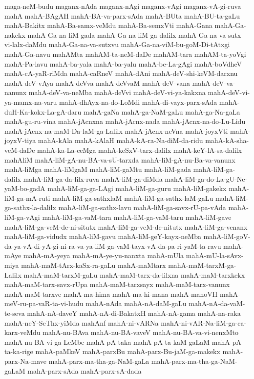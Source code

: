 {maga-neM-budu
maganx-nAda
maganx-nAgi
maganx-vAgi
maganx-vA-gi-ruva
mahA
mahA-BAgAH
mahA-BA-va-parx-sAda
mahA-BUta
mahA-BU-ta-gaLu
mahA-Bakitx
mahA-Ba-samx-veMdu
mahA-Ba-semxVti
mahA-Gana
mahA-Ga-nakekx
mahA-Ga-na-liM-gada
mahA-Ga-na-liM-ga-dalilx
mahA-Ga-na-va-sutx-vi-lalx-daMdu
mahA-Ga-na-va-sutxvu
mahA-Ga-na-viM-bu-goM-Di-tAtxgi
mahA-Ga-navu
mahAMta
mahAM-ta-neM-daDe
mahAM-tara
mahAM-ta-yoVgi
mahA-Pa-lavu
mahA-ba-yala
mahA-ba-yalu
mahA-be-La-gAgi
mahA-boVdheV
mahA-cA-yaR-riMda
mahA-caRneV
mahA-dAni
mahA-deV-shi-keVM-darxnu
mahA-deV-vAya
mahA-deVva
mahA-deVvaM
mahA-deV-vana
mahA-deV-va-nanunx
mahA-deV-va-neMba
mahA-deVvi
mahA-deV-vi-ya-kakxna
mahA-deV-vi-ya-mamx-na-varu
mahA-dhAyx-na-do-LoMdi
mahA-di-vayx-parx-sAda
mahA-duH-Ka-kokx-La-gA-daru
mahA-gaNa
mahA-ga-NaM-gaLu
mahA-ga-Na-gaLa
mahA-gu-ru-vina
mahA-jAcnxna
mahA-jAcnx-nada
mahA-jAcnx-na-do-Lu-Lidu
mahA-jAcnx-na-maM-Da-laM-ga-Lalilx
mahA-jAcnx-neVna
mahA-joyxVti
mahA-joyxV-tiya
mahA-kAla
mahA-kAlaH
mahA-kA-ra-Na-diM-da-ridu
mahA-kA-sha-veM-daDe
mahA-ka-La-ceMga
mahA-keSxV-tarx-dalilx
mahA-keY-lA-sa-dalilx
mahAliM
mahA-liM-gA-nu-BA-va-sU-tarxda
mahA-liM-gA-nu-Ba-va-vanunx
mahA-liMga
mahA-liMgaM
mahA-liM-gaMtu
mahA-liM-gada
mahA-liM-ga-dalilx
mahA-liM-ga-da-lilx-ruva
mahA-liM-ga-diMda
mahA-liM-ga-do-La-gU-Ne-yaM-bo-gadA
mahA-liM-ga-ga-LAgi
mahA-liM-ga-guru
mahA-liM-gakekx
mahA-liM-ga-mA-ruti
mahA-liM-ga-sathxlaM
mahA-liM-ga-sathx-laM-gaLu
mahA-liM-ga-sathx-la-dalilx
mahA-liM-ga-sathx-lavu
mahA-liM-ga-savx-rU-pa-vAda
mahA-liM-ga-vAgi
mahA-liM-ga-vaM-tara
mahA-liM-ga-vaM-taru
mahA-liM-gave
mahA-liM-ga-veM-de-ni-situtx
mahA-liM-ga-veM-de-nitutx
mahA-liM-ga-venanx
mahA-liM-ga-vidudx
mahA-liM-gavu
mahA-liM-geY-kayx-neMba
mahA-liM-goV-da-ya-vA-di-yA-gi-ni-ra-va-ya-liM-ga-vaM-tayx-vA-da-pa-ri-yaM-ta-ravu
mahA-mAye
mahA-mA-yeya
mahA-mA-ye-yu-nanxta
mahA-mUla
mahA-mU-la-sAvx-miya
mahA-maM-tArx-kaSx-ra-gaLu
mahA-maMtarx
mahA-maM-tarxM-ga-Lalilx
mahA-maM-tarxM-gaLu
mahA-maM-tarx-da-lilxna
mahA-maM-tarxkekx
mahA-maM-tarx-savx-rUpa
mahA-maM-tarxsayx
mahA-maM-tarx-vanunx
mahA-maM-tarxve
mahA-ma-hima
mahA-ma-hi-mana
mahA-manoVH
mahA-meV-ru-pa-vaR-ta-vi-hudu
mahA-nAda
mahA-nA-daM-gaLu
mahA-nA-da-vaM-te-seva
mahA-nA-daveY
mahA-nA-di-BakatxH
mahA-nA-gama
mahA-na-raka
mahA-neY-SeThx-yiMda
mahAnf
mahA-ni-vARNa
mahA-ni-vAR-Na-liM-ga-ca-karx-veMdu
mahA-nu-BAva
mahA-nu-BA-vaveV
mahA-nu-BA-va-vi-nenxMto
mahA-nu-BA-vi-ga-LeMbe
mahA-pA-taka
mahA-pA-ta-kaM-gaLaM
mahA-pA-ta-ka-rige
mahA-paMkeV
mahA-parxBu
mahA-parx-Bu-jaM-ga-makekx
mahA-parx-Na-mave
mahA-parx-ma-tha-ga-NaM-gaLa
mahA-parx-ma-tha-ga-NaM-gaLaM
mahA-parx-sAda
mahA-parx-sA-dada
}
